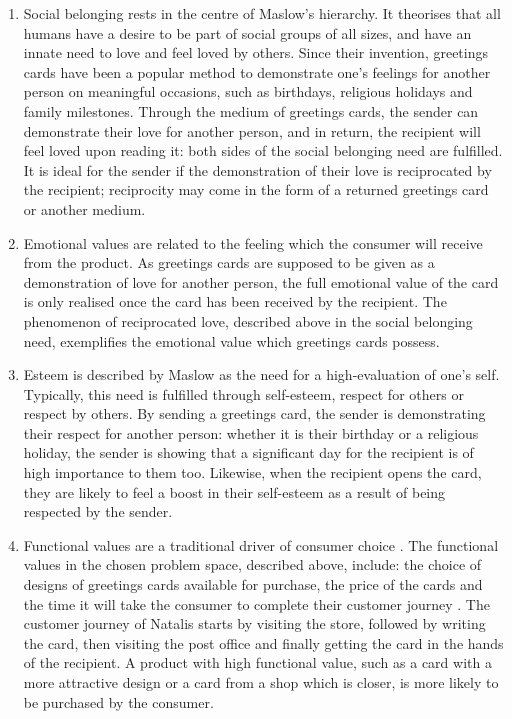 \begin{enumerate}
  \item Social belonging rests in the centre of Maslow's hierarchy. It theorises that all humans have a desire to be part of social groups of all sizes, and have an innate need to love and feel loved by others. Since their invention, greetings cards have been a popular method to demonstrate one's feelings for another person on meaningful occasions, such as birthdays, religious holidays and family milestones. Through the medium of greetings cards, the sender can demonstrate their love for another person, and in return, the recipient will feel loved upon reading it: both sides of the social belonging need are fulfilled. It is ideal for the sender if the demonstration of their love is reciprocated by the recipient; reciprocity may come in the form of a returned greetings card or another medium.
  \item Emotional values are related to the feeling which the consumer will receive from the product. As greetings cards are supposed to be given as a demonstration of love for another person, the full emotional value of the card is only realised once the card has been received by the recipient. The phenomenon of reciprocated love, described above in the social belonging need, exemplifies the emotional value which greetings cards possess.
  \item Esteem is described by Maslow \citep{maslow1943theory} as the need for a high-evaluation of one's self. Typically, this need is fulfilled through self-esteem, respect for others or respect by others. By sending a greetings card, the sender is demonstrating their respect for another person: whether it is their birthday or a religious holiday, the sender is showing that a significant day for the recipient is of high importance to them too. Likewise, when the recipient opens the card, they are likely to feel a boost in their self-esteem as a result of being respected by the sender.
  \item Functional values are a traditional driver of consumer choice \citep{sheth1991we}. The functional values in the chosen problem space, described above, include: the choice of designs of greetings cards available for purchase, the price of the cards and the time it will take the consumer to complete their customer journey \citep{edelman2015competing}. The customer journey of Natalis starts by visiting the store, followed by writing the card, then visiting the post office and finally getting the card in the hands of the recipient. A product with high functional value, such as a card with a more attractive design or a card from a shop which is closer, is more likely to be purchased by the consumer.

\end{enumerate}
